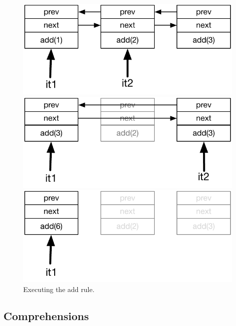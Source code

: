 \begin{figure}
\centering
\begin{minipage}{.40\textwidth}
  \centering
  \includegraphics[width=.9\linewidth]{figures/update}
\end{minipage}\hspace{0.5cm}
\begin{minipage}{.40\textwidth}
  \centering
  \includegraphics[width=0.9\linewidth]{figures/update2}
\end{minipage}
\begin{minipage}{.40\textwidth}
   \centering
  \includegraphics[width=0.9\linewidth]{figures/update3}
\end{minipage}
\caption{Executing the add rule.}
\label{fig:update_add}
\end{figure}

\subsection{Comprehensions}

